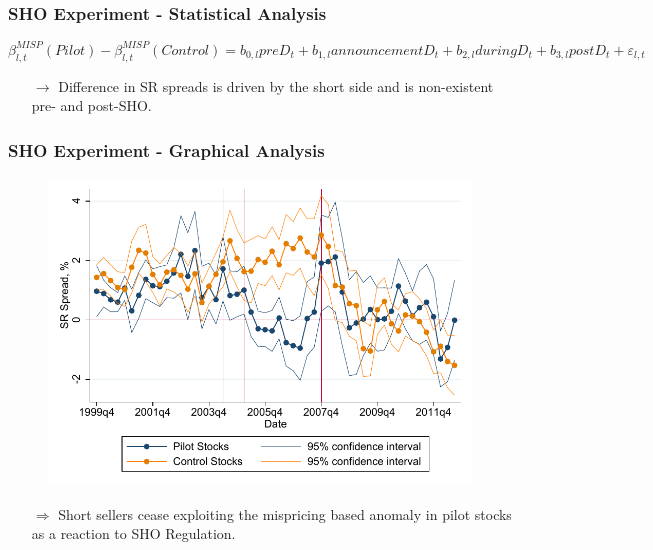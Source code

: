 \documentclass{beamer}
\begin{document}
\begin{frame}
\frametitle{SHO Experiment - Statistical Analysis}
\vspace*{-0.4cm}
{\scriptsize
		\begin{equation} \nonumber
 \beta^{MISP}_{l,t}(Pilot) - \beta^{MISP}_{l,t}(Control) = b_{0,l}  preD_t + b_{1,l}  announcementD_t + b_{2,l}  duringD_t + b_{3,l}  postD_t + \varepsilon_{l,t}
\end{equation}
}
\vspace*{-1cm}
\begin{table}[htbp]
  \centering
  \footnotesize
  	  \resizebox{0.7\textwidth}{!}{	 	
	 	
	\label{tab:sho_experiment}%
	}
\end{table}
\begin{itemize}
\item[$\rightarrow$] Difference in SR spreads is driven by the short side and is non-existent pre- and post-SHO. 
\end{itemize}

	\end{frame}
	
\begin{frame}
\frametitle{SHO Experiment - Graphical Analysis}
\vspace*{-0.3cm}
\begin{figure}[htbp]
\centering
	\includegraphics[scale=0.6,trim=4 4 4 4,clip]{figures/SHO_misp_graph.pdf} 
	\label{tab:SHO_misp_graph}%
\end{figure}
\begin{itemize}
\vspace*{-0.4cm}

\item[$\Rightarrow$] Short sellers cease exploiting the mispricing based anomaly in pilot stocks as a reaction to SHO Regulation. 
\end{itemize}
\end{frame}
\end{document}
